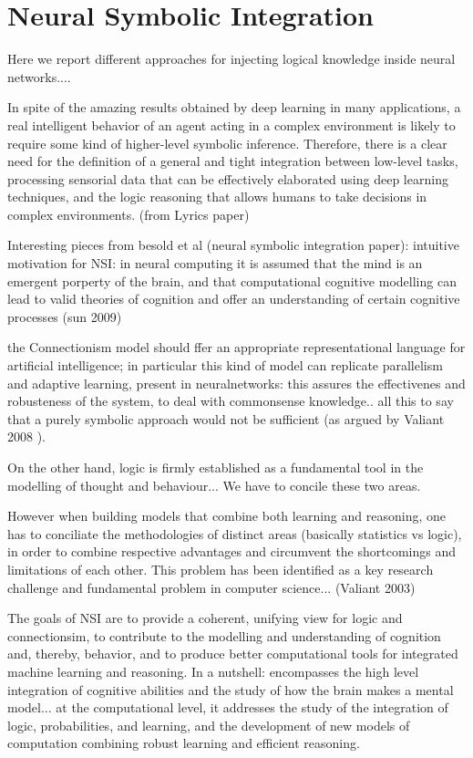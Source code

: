 
\chapter{Neural Symbolic Integration}
Here we report different approaches for injecting logical knowledge inside neural networks....

 In spite of the amazing results obtained by deep learning in
 many applications, a real intelligent behavior of an agent acting in a
 complex environment is likely to require some kind of higher-level symbolic
 inference. Therefore, there is a clear need for the definition of a general and
 tight integration between low-level tasks, processing sensorial data that
 can be effectively elaborated using deep learning techniques, and the logic
 reasoning that allows humans to take decisions in complex environments. (from Lyrics paper)

Interesting pieces from besold et al (neural symbolic integration paper): intuitive motivation for NSI:
in neural computing it is assumed that the mind is an emergent porperty of the brain, and that computational cognitive modelling can lead to valid theories of cognition and offer an understanding of certain cognitive processes (sun 2009)

the Connectionism model should ffer an appropriate representational language for artificial intelligence; in particular this kind of model can replicate parallelism and adaptive learning, present in neuralnetworks: this assures the effectivenes and robusteness of the system, to deal with commonsense knowledge.. all this to say that a purely symbolic approach would not be sufficient (as argued by Valiant 2008 ).

On the other hand, logic is firmly established as a fundamental tool in the modelling of thought and behaviour... We have to concile these two areas.

However when building models that combine both learning and reasoning, one has to conciliate the methodologies of distinct areas (basically statistics vs logic), in order to combine respective advantages and circumvent the shortcomings and limitations of each other. This problem has been identified as a key research challenge and fundamental problem in computer science... (Valiant 2003)

The goals of NSI are to provide a coherent, unifying view for logic and connectionsim, to contribute to the modelling and understanding of cognition and, thereby, behavior, and to produce better computational tools for integrated machine learning and reasoning. In a nutshell: encompasses the high level integration of cognitive abilities and the study of how the brain makes a mental model... at the computational level, it addresses the study of the integration of logic, probabilities, and learning, and the development of new models of computation combining robust learning and efficient reasoning.

